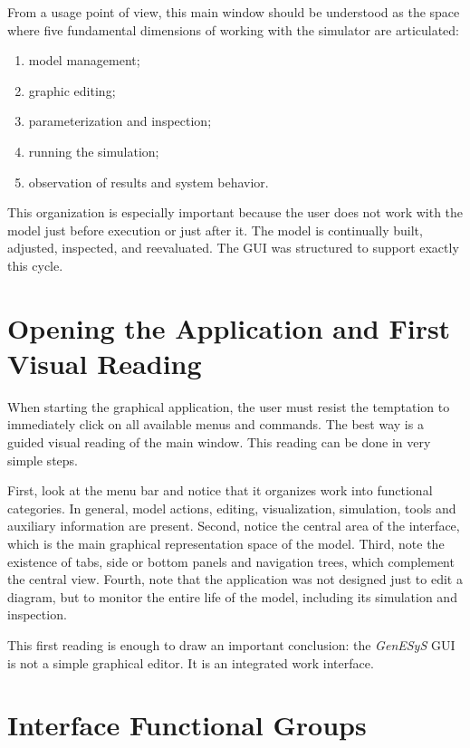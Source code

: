 From a usage point of view, this main window should be understood as the space where five fundamental dimensions of working with the simulator are articulated:

\begin{enumerate}
\item model management;
\item graphic editing;
\item parameterization and inspection;
\item running the simulation;
\item observation of results and system behavior.
\end{enumerate}

This organization is especially important because the user does not work with the model just before execution or just after it. The model is continually built, adjusted, inspected, and reevaluated. The GUI was structured to support exactly this cycle.

\section{Opening the Application and First Visual Reading}
\label{sec:cap3_abertura_e_leitura_visual}

When starting the graphical application, the user must resist the temptation to immediately click on all available menus and commands. The best way is a guided visual reading of the main window. This reading can be done in very simple steps.

First, look at the menu bar and notice that it organizes work into functional categories. In general, model actions, editing, visualization, simulation, tools and auxiliary information are present. Second, notice the central area of the interface, which is the main graphical representation space of the model. Third, note the existence of tabs, side or bottom panels and navigation trees, which complement the central view. Fourth, note that the application was not designed just to edit a diagram, but to monitor the entire life of the model, including its simulation and inspection.

This first reading is enough to draw an important conclusion: the \textit{GenESyS} GUI is not a simple graphical editor. It is an integrated work interface.

\section{Interface Functional Groups}
\label{sec:cap3_grupos_funcionais_interface}

